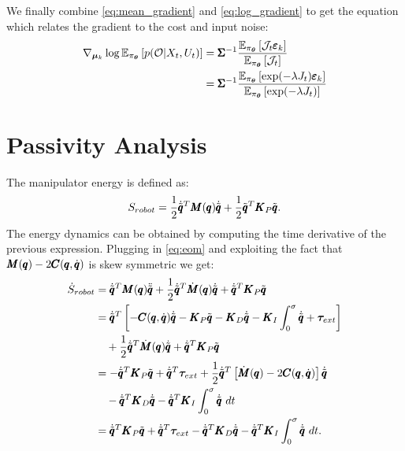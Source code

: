 We finally combine \eqref{eq:mean_gradient} and \eqref{eq:log_gradient} to get the equation which relates the gradient to the cost and input noise:
\begin{align}
     \nabla_{\boldsymbol{\mu}_k} \log \mathbb{E}_{\pi_{\boldsymbol{\theta}}} \left [p(\mathcal{O} | X_t, U_t)\right] 
     &= \pmb{\Sigma}^{-1} \frac{\mathbb{E}_{\pi_{\boldsymbol{\theta}}} \left [\mathcal{J}_t \pmb{\varepsilon}_k\right]}{\mathbb{E}_{\pi_{\boldsymbol{\theta}}} \left [\mathcal{J}_t\right]} \\
     &= \pmb{\Sigma}^{-1} \frac{\mathbb{E}_{\pi_{\boldsymbol{\theta}}} \left [\exp(-\lambda J_t) \pmb{\varepsilon}_k\right]}{\mathbb{E}_{\pi_{\boldsymbol{\theta}}} \left [\exp(-\lambda J_t)\right]}
\end{align}

\section{Passivity Analysis}\label{app:passivity_analysis}
The manipulator energy is defined as:
\begin{equation}
    S_{robot} = \frac{1}{2} \dot{\tilde{\pmb{q}}}^T \pmb{M}(\pmb{q}) \dot{\tilde{\pmb{q}}} + \frac{1}{2} \tilde{\pmb{q}}^T \pmb{K}_P \tilde{\pmb{q}}.
\end{equation}
The energy dynamics can be obtained by computing the time derivative of the previous expression. Plugging in \eqref{eq:eom} and exploiting the fact that $\pmb{M}(\pmb{q}) - 2 \pmb{C}(\pmb{q}, \dot{\pmb{q}})$ is skew symmetric we get:
\begin{equation*}
\begin{aligned}
    \dot{S}_{robot} &= \dconfigRobotError^T \massMatrix \ddconfigRobotError + \frac{1}{2} \dconfigRobotError^T \dot{\matr{M}}(\configRobot) \dconfigRobotError + \dconfigRobotError^T \matr{K}_P \configRobotError \\
    &= \dconfigRobotError^T \left[ -\coriolis \dconfigRobotError - \matr{K}_P \configRobotError - \matr{K}_D \dconfigRobotError - \matr{K}_I \int_{0}^{\sigma} \dconfigRobotError + \externalTorque \right] \\
    &\quad + \frac{1}{2} \dconfigRobotError^T \dot{\matr{M}}(\configRobot) \dconfigRobotError + \dconfigRobotError^T \matr{K}_P \configRobotError \\
    &= -\dconfigRobotError^T \matr{K}_P \configRobotError + \dconfigRobotError^T \externalTorque + \frac{1}{2} \dconfigRobotError^T\left[ \dot{\matr{M}}(\configRobot) - 2\coriolis \right] \dconfigRobotError \\
    &\quad - \dconfigRobotError^T \matr{K}_D \dconfigRobotError  - \dconfigRobotError^T \matr{K}_I \int^{\sigma}_{0} \dconfigRobotError\ dt\\
    &= \dconfigRobotError^T \matr{K}_P \configRobotError + \dconfigRobotError^T \externalTorque - \dconfigRobotError^T \matr{K}_D \dconfigRobotError -  \dconfigRobotError^T \matr{K}_I \int^{\sigma}_{0} \dconfigRobotError\ dt.  
\end{aligned}
\end{equation*}
